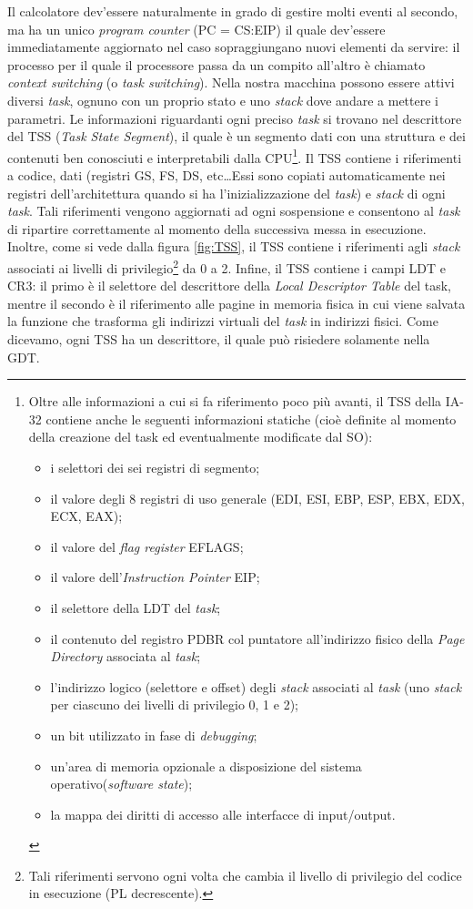 Il calcolatore dev'essere naturalmente in grado di gestire molti eventi al secondo, ma ha un unico \textit{program counter} (PC = CS:EIP) il quale dev'essere immediatamente aggiornato nel caso sopraggiungano nuovi elementi da servire: il processo per il quale il processore passa da un compito all'altro è chiamato \textit{context switching} (o \textit{task switching}). Nella nostra macchina possono essere attivi diversi \textit{task}, ognuno con un proprio stato e uno \textit{stack} dove andare a mettere i parametri. Le informazioni riguardanti ogni preciso \textit{task} si trovano nel descrittore del TSS (\textit{Task State Segment}), il quale è un segmento dati con una struttura e dei contenuti ben conosciuti e interpretabili dalla CPU\footnote{Oltre alle informazioni a cui si fa riferimento poco più avanti, il TSS della IA-32 contiene anche le seguenti informazioni
statiche (cioè definite al momento della creazione del task ed eventualmente modificate
dal SO):
\begin{itemize}
\item i selettori dei sei registri di segmento;
\item il valore degli 8 registri di uso generale (EDI, ESI, EBP, ESP, EBX,
EDX, ECX, EAX);
\item il valore del \textit{flag register} EFLAGS;
\item il valore dell'\textit{Instruction Pointer} EIP;
\item il selettore della LDT del \textit{task};
\item il contenuto del registro PDBR col puntatore all'indirizzo fisico della \textit{Page Directory} associata al \textit{task};
\item l'indirizzo logico (selettore e offset) degli \textit{stack} associati al \textit{task} (uno \textit{stack}
per ciascuno dei livelli di privilegio 0, 1 e 2);
\item un bit utilizzato in fase di \textit{debugging};
\item un'area di memoria opzionale a disposizione del sistema operativo(\textit{software state});
\item la mappa dei diritti di accesso alle interfacce di input/output.
\end{itemize}}. Il TSS contiene i riferimenti a codice, dati (registri GS, FS, DS, etc\ldots Essi sono copiati automaticamente nei registri dell'architettura quando si ha l'inizializzazione del \textit{task}) e \textit{stack} di ogni \textit{task}. Tali riferimenti vengono aggiornati ad ogni sospensione e consentono al \textit{task} di ripartire correttamente al momento della successiva messa in esecuzione. Inoltre, come si vede dalla figura \ref{fig:TSS}, il TSS contiene i riferimenti agli \textit{stack} associati ai livelli di privilegio\footnote{Tali riferimenti servono ogni volta che cambia il livello di privilegio del codice in esecuzione (PL decrescente).} da 0 a 2. Infine, il TSS contiene i campi LDT e CR3: il primo è il selettore del descrittore della \textit{Local Descriptor Table} del task, mentre il secondo è il riferimento alle pagine in memoria fisica in cui viene salvata la funzione che trasforma gli indirizzi virtuali del \textit{task} in indirizzi fisici. 
Come dicevamo, ogni TSS ha un descrittore, il quale può risiedere solamente nella GDT.

